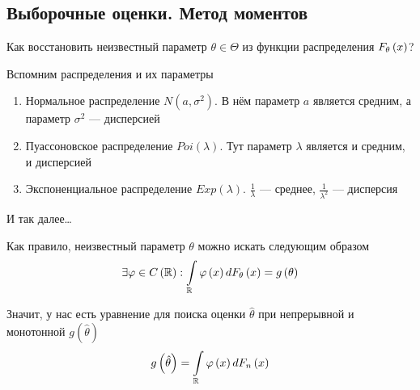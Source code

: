 \subsection{Выборочные оценки. Метод моментов}
Как восстановить неизвестный параметр $\theta\in\Theta$
из функции распределения $F_{\theta}\left(x\right)$?

Вспомним распределения и их параметры
\begin{enumerate}
    \item Нормальное распределение $N\left(a,\sigma^2\right)$.
        В нём параметр $a$ является средним,
        а параметр $\sigma^2$ --- дисперсией
    \item Пуассоновское распределение $Poi\left(\lambda\right)$.
        Тут параметр $\lambda$ является и средним, и дисперсией
    \item Экспоненциальное распределение $Exp\left(\lambda\right)$.
        $\frac{1}{\lambda}$ --- среднее,
        $\frac{1}{\lambda^2}$ --- дисперсия
\end{enumerate}
И так далее\ldots

Как правило, неизвестный параметр $\theta$ можно искать следующим образом
$$\exists\varphi\in C\left(\mathbb{R}\right):
    \int\limits_{\mathbb{R}}\varphi\left(x\right)dF_{\theta}\left(x\right)
        =g\left(\theta\right)$$

Значит, у нас есть уравнение для поиска оценки $\hat{\theta}$
при непрерывной и монотонной $g\left( \hat{\theta} \right)$
\begin{equation}\label{eq:unknown_parameter}
g\left(\hat{\theta}\right)
    =\int\limits_{\mathbb{R}}\varphi\left(x\right)dF_n\left(x\right)
\end{equation}

